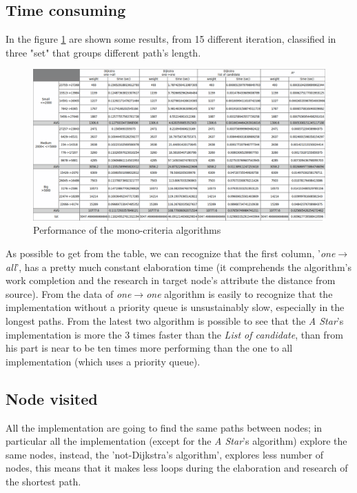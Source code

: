 \documentclass[a4paper,11pt]{report}
\begin{document}
\subsection{Time consuming} 
In the figure \ref{fig:monoCriteriaOutput} are shown some results, from 15 different iteration, classified in three "set" that groups different path's length.
\begin{figure}[H]
	\centering
	\includegraphics[width=\linewidth]{monoCriteriaOutput.png}
	\caption{Performance of the mono-criteria algorithms}
	\label{fig:monoCriteriaOutput}
\end{figure}
As possible to get from the table, we can recognize that the first column, '\textit{one$\to$all}', has a pretty much constant elaboration time (it comprehends the algorithm's work completion and the research in target node's attribute the distance from source). From the data of \textit{one$\to$one} algorithm is easily to recognize that the implementation without a priority queue is unsustainably slow, especially in the longest paths. From the latest two algorithm is possible to see that the \textit{A Star}'s implementation is more the 3 times faster than the \textit{List of candidate}, than from his part is near to be ten times more performing than the one to all implementation (which uses a priority queue).

\subsection{Node visited}

All the implementation are going to find the same paths between nodes; in particular all the implementation (except for the \textit{A Star}'s algorithm) explore the same nodes, instead, the 'not-Dijkstra's algorithm', explores less number of nodes, this means that it makes less loops during the elaboration and research of the shortest path.
\end{document}
